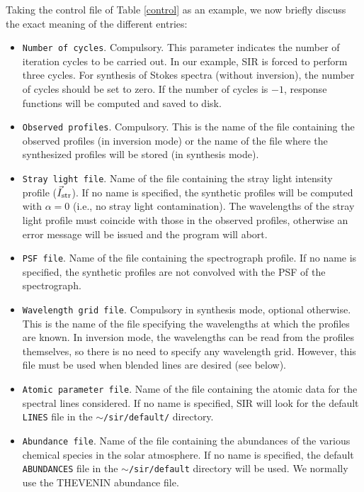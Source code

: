 Taking the control file of Table \ref{control} as an example, we now
briefly discuss the exact meaning of the different entries:
\begin{itemize}
\item {\tt Number of cycles}. Compulsory. This parameter indicates the
number of iteration cycles to be carried out. In our example, SIR is
forced to perform three cycles. For synthesis of Stokes spectra
(without inversion), the number of cycles should be set to zero. 
If the number of cycles is $-1$, response functions will be computed and
saved to disk.
\item {\tt Observed profiles}. Compulsory. This is the name of the file
containing the observed profiles (in inversion mode) or the name of the
file where the synthesized profiles will be stored (in synthesis mode).
\item {\tt Stray light file}. Name of the file containing the stray
light intensity profile ($\vec{I}_{\rm str}$). If no name is specified,
the synthetic profiles will be computed with $\alpha=0$ (i.e., no stray
light contamination). The wavelengths of the stray light profile
must coincide with those in the observed profiles, otherwise
an error message will be issued and the program will abort.
\item {\tt PSF file}. Name of the file containing the spectrograph profile. If
no name is specified, the synthetic profiles are not convolved with the PSF of
the spectrograph.
\item {\tt Wavelength grid file}. Compulsory in synthesis mode, optional otherwise. 
This is the name of the file specifying the wavelengths at which the profiles are
known. In inversion mode, the wavelengths can be read from the profiles themselves,
so there is no need to specify any wavelength grid. However, this file must be
used when blended lines are desired (see below). 
\item {\tt Atomic parameter file}. Name of the file containing the atomic data
for the spectral lines considered. If no name is specified, SIR will look for
the default {\tt LINES} file in the {\tt $\sim$/sir/default/} directory.
\item {\tt Abundance file}. Name of the file containing the abundances of the
various chemical species in the solar atmosphere. If no name is specified, the
default {\tt ABUNDANCES} file in the {\tt $\sim $/sir/default} directory will be used. 
We normally use the THEVENIN abundance file.


\end{itemize}
